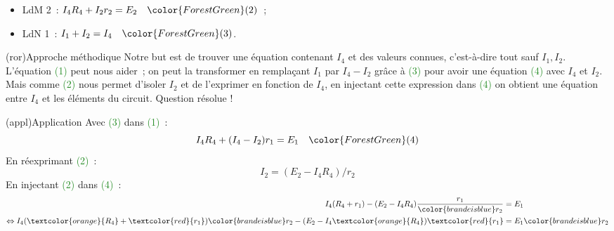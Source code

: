 \documentclass[../../main/main.tex]{subfiles}
\begin{document}
{\begin{tcbraster}[raster columns=2, raster equal height=rows]
\begin{tcolorbox}[blankest, space to=\myspace]
\begin{tcbraster}[raster columns=1]
\begin{tcb}
\begin{itemize}
                    \item LdM 2~: $I_4R_4 + I_2r_2 = E_2 \quad \color{ForestGreen}(2)$~;
                    \item LdN 1~: $I_1 + I_2 = I_4 \quad \color{ForestGreen}(3)$.
                \end{itemize}
            \end{tcb} 
        \end{tcbraster}
    \end{tcolorbox}
\end{tcbraster}
\begin{tcbraster}[raster columns=7, raster equal height=rows]
    \begin{tcb}[raster multicolumn=3](ror){Approche méthodique}
        Notre but est de trouver une équation contenant $I_4$ et des valeurs
        connues, c'est-à-dire tout sauf $I_1, I_2$.
        \bigbreak
        L'équation \textcolor{ForestGreen}{(1)} peut nous aider~; on peut la
        transformer en remplaçant $I_1$ par $I_4-I_2$ grâce à
        \textcolor{ForestGreen}{(3)} pour avoir une équation
        \textcolor{ForestGreen}{(4)} avec $I_4$ et $I_2$.
        \bigbreak
        Mais comme \textcolor{ForestGreen}{(2)} nous permet d'isoler $I_2$ et de
        l'exprimer en fonction de $I_4$, en injectant cette expression dans
        \textcolor{ForestGreen}{(4)} on obtient une équation entre $I_4$ et les
        éléments du circuit. Question résolue !
    \end{tcb}
    \begin{tcb}[raster multicolumn=4](appl){Application}
        Avec \textcolor{ForestGreen}{(3)} dans \textcolor{ForestGreen}{(1)}~:
        \[I_4R_4 + (I_4-I_2)r_1 = E_1 \quad \color{ForestGreen}(4)\]
        En réexprimant \textcolor{ForestGreen}{(2)}~:
        \[I_2 = (E_2 - I_4R_4)/r_2\]
        En injectant \textcolor{ForestGreen}{(2)} dans
        \textcolor{ForestGreen}{(4)}~:
        \begin{align*}
            I_4(R_4+r_1) - (E_2-I_4R_4) \frac{r_1}{\color{brandeisblue}r_2}
                &= E_1\\
                \Leftrightarrow I_4(\textcolor{orange}{R_4} +
                                    \textcolor{red}{r_1})
                                    {\color{brandeisblue}r_2}
                                    -
                                    (E_2-I_4\textcolor{orange}{R_4})
                                    \textcolor{red}{r_1}
                &= E_1{\color{brandeisblue}r_2}\\

\end{align*}
\end{tcb}
\end{tcbraster}}
\end{document}
